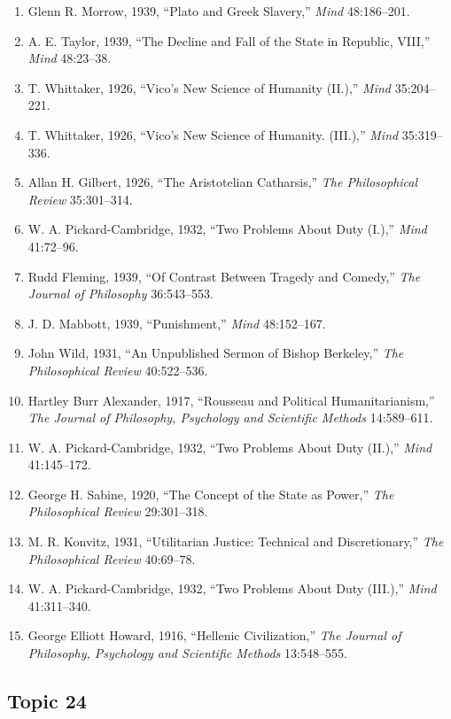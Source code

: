 \documentclass[
]{article}
\begin{document}
\begin{enumerate}
\def\labelenumi{\arabic{enumi}.}
\item
  Glenn R. Morrow, 1939, ``Plato and Greek Slavery,'' \emph{Mind}
  48:186--201.
\item
  A. E. Taylor, 1939, ``The Decline and Fall of the State in Republic,
  VIII,'' \emph{Mind} 48:23--38.
\item
  T. Whittaker, 1926, ``Vico's New Science of Humanity (II.),''
  \emph{Mind} 35:204--221.
\item
  T. Whittaker, 1926, ``Vico's New Science of Humanity. (III.),''
  \emph{Mind} 35:319--336.
\item
  Allan H. Gilbert, 1926, ``The Aristotelian Catharsis,'' \emph{The
  Philosophical Review} 35:301--314.
\item
  W. A. Pickard-Cambridge, 1932, ``Two Problems About Duty (I.),''
  \emph{Mind} 41:72--96.
\item
  Rudd Fleming, 1939, ``Of Contrast Between Tragedy and Comedy,''
  \emph{The Journal of Philosophy} 36:543--553.
\item
  J. D. Mabbott, 1939, ``Punishment,'' \emph{Mind} 48:152--167.
\item
  John Wild, 1931, ``An Unpublished Sermon of Bishop Berkeley,''
  \emph{The Philosophical Review} 40:522--536.
\item
  Hartley Burr Alexander, 1917, ``Rousseau and Political
  Humanitarianism,'' \emph{The Journal of Philosophy, Psychology and
  Scientific Methods} 14:589--611.
\item
  W. A. Pickard-Cambridge, 1932, ``Two Problems About Duty (II.),''
  \emph{Mind} 41:145--172.
\item
  George H. Sabine, 1920, ``The Concept of the State as Power,''
  \emph{The Philosophical Review} 29:301--318.
\item
  M. R. Konvitz, 1931, ``Utilitarian Justice: Technical and
  Discretionary,'' \emph{The Philosophical Review} 40:69--78.
\item
  W. A. Pickard-Cambridge, 1932, ``Two Problems About Duty (III.),''
  \emph{Mind} 41:311--340.
\item
  George Elliott Howard, 1916, ``Hellenic Civilization,'' \emph{The
  Journal of Philosophy, Psychology and Scientific Methods} 13:548--555.
\end{enumerate}

\newpage

\hypertarget{topic-24}{%
\subsection{Topic 24}\label{topic-24}}
\end{document}
